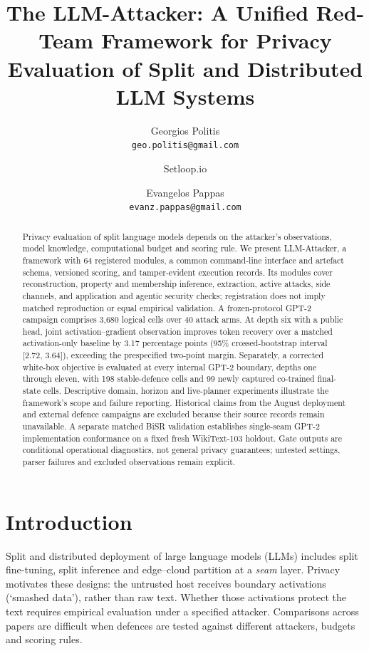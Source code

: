 \documentclass[11pt]{article}
\title{The LLM-Attacker: A Unified Red-Team Framework for Privacy\\
Evaluation of Split and Distributed LLM Systems}
\author{Georgios Politis\\ {\small\texttt{geo.politis@gmail.com}} \and Setloop.io \and
  Evangelos Pappas\\ {\small\texttt{evanz.pappas@gmail.com}}}
\date{}
\begin{document}
\maketitle

\begin{abstract}
Privacy evaluation of split language models depends on the attacker's observations, model knowledge, computational budget and scoring rule. We present LLM-Attacker, a framework with 64 registered modules, a common command-line interface and artefact schema, versioned scoring, and tamper-evident execution records. Its modules cover reconstruction, property and membership inference, extraction, active attacks, side channels, and application and agentic security checks; registration does not imply matched reproduction or equal empirical validation. A frozen-protocol GPT-2 campaign comprises 3{,}680 logical cells over 40 attack arms. At depth six with a public head, joint activation--gradient observation improves token recovery over a matched activation-only baseline by 3.17 percentage points (95\% crossed-bootstrap interval [2.72, 3.64]), exceeding the prespecified two-point margin. Separately, a corrected white-box objective is evaluated at every internal GPT-2 boundary, depths one through eleven, with 198 stable-defence cells and 99 newly captured co-trained final-state cells. Descriptive domain, horizon and live-planner experiments illustrate the framework's scope and failure reporting. Historical claims from the August deployment and external defence campaigns are excluded because their source records remain unavailable. A separate matched BiSR validation establishes single-seam GPT-2 implementation conformance on a fixed fresh WikiText-103 holdout. Gate outputs are conditional operational diagnostics, not general privacy guarantees; untested settings, parser failures and excluded observations remain explicit.
\end{abstract}

\section{Introduction}
\label{sec:intro}

Split and distributed deployment of large language models (LLMs) includes
split fine-tuning, split inference and edge--cloud partition at a
\emph{seam} layer. Privacy motivates these designs: the untrusted host
receives boundary activations (`smashed data'), rather than raw text.
Whether those activations protect the text requires empirical evaluation
under a specified attacker. Comparisons across papers are difficult when
defences are tested against different attackers, budgets and scoring rules.
\end{document}
